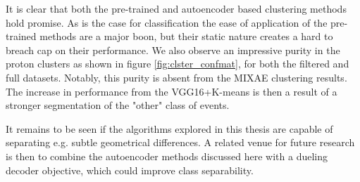 It is clear that both the pre-trained and autoencoder based clustering methods hold promise. As is the case for classification the ease of application of the pre-trained methods are a major boon, but their static nature creates a hard to breach cap on their performance. We also observe an impressive purity in the proton clusters as shown in figure \ref{fig:clster_confmat}, for both the filtered and full datasets. Notably, this purity is absent from the MIXAE clustering results. The increase in performance from the VGG16+K-means is then a result of a stronger segmentation of the "other" class of events.

It remains to be seen if the algorithms explored in this thesis are capable of separating e.g. subtle geometrical differences. A related venue for future research is then to combine the autoencoder methods discussed here with a dueling decoder objective, which could improve class separability.

